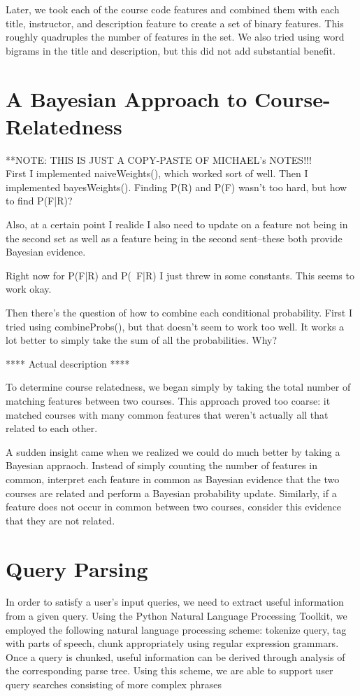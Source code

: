 \documentclass[12pt]{article}
\begin{document}
Later, we took each of the course code features and combined them with
each title, instructor, and description feature to create a set of
binary features. This roughly quadruples the number of features in the
set. We also tried using word bigrams in the title and description,
but this did not add substantial benefit.

\section*{A Bayesian Approach to Course-Relatedness}
**NOTE: THIS IS JUST A COPY-PASTE OF MICHAEL's NOTES!!!\\

First I implemented naiveWeights(), which worked sort of well. Then I implemented bayesWeights(). Finding P(R) and P(F) wasn't too hard, but how to find P(F|R)?

Also, at a certain point I realide I also need to update on a feature not being in the second set as well as a feature being in the second sent--these both provide Bayesian evidence.

Right now for P(F|R) and P(~F|R) I just threw in some constants. This seems to work okay.

Then there's the question of how to combine each conditional
probability. First I tried using combineProbs(), but that doesn't seem
to work too well. It works a lot better to simply take the sum of all
the probabilities. Why?

**** Actual description ****

To determine course relatedness, we began simply by taking the total
number of matching features between two courses. This approach proved
too coarse: it matched courses with many common features that weren't
actually all that related to each other.

A sudden insight came when we realized we could do much better by
taking a Bayesian appraoch. Instead of simply counting the number of
features in common, interpret each feature in common as Bayesian
evidence that the two courses are related and perform a Bayesian
probability update. Similarly, if a feature does not occur in common
between two courses, consider this evidence that they are not related.

\section*{Query Parsing}
In order to satisfy a user's input queries, we need to extract useful information from a given query. Using the Python Natural Language Processing Toolkit, we employed the following natural language processing scheme: tokenize query, tag with parts of speech, chunk appropriately using regular expression grammars. Once a query is chunked, useful information can be derived through analysis of the corresponding parse tree. Using this scheme, we are able to support user query searches consisting of more complex phrases 
\end{document}
